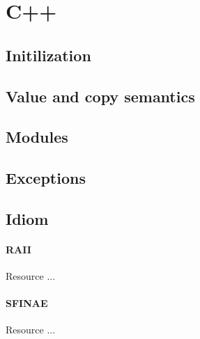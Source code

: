\section{C++}
\subsection{Initilization}
\subsection{Value and copy semantics}
\subsection{Modules}
\subsection{Exceptions}
\subsection{Idiom}
\paragraph{RAII} Resource ...
\paragraph{SFINAE} Resource ...

